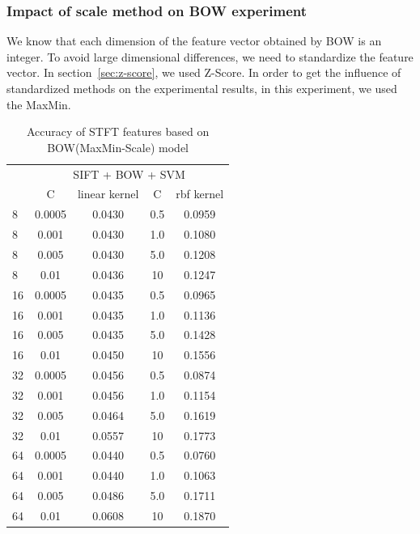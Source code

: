 \documentclass[conference]{IEEEtran}
\begin{document}
\subsubsection{Impact of scale method on BOW experiment}
We know that each dimension of the feature vector obtained by BOW is an integer. To avoid large dimensional differences, we need to standardize the feature vector. In section~\ref{sec:z-score}, we used Z-Score. In order to get the influence of standardized methods on the experimental results, in this experiment, we used the MaxMin.

\begin{table}[htbp]
	\centering
	\newcommand{\tabincell}[2]{\begin{tabular}{@{}#1@{}}#2\end{tabular}}
	\renewcommand\arraystretch{1.0}
	\caption{Accuracy of STFT features based on BOW(MaxMin-Scale) model}
	\label{base6}%
	\begin{tabular}{@{}p{1cm}<{\centering}|c|c|c|c}
		\hline
		\multirow{2}{*}{\diagbox[height=2\line,width=1.42cm,font=\tiny]{$k$}{Acc.}{$\mathit{M}$}} &
		\multicolumn{4}{c}{SIFT + BOW + SVM}\\
		\cline{2-5}
		& {C} & {linear kernel} & {C} & {rbf kernel}\\
		\hline
		8   & 0.0005 & 0.0430 & 0.5 & 0.0959\\
		8   & 0.001 & 0.0430 & 1.0 & 0.1080\\
		8   & 0.005 & 0.0430 & 5.0 & 0.1208\\
		8   & 0.01  & 0.0436 & 10 & 0.1247\\
		16   & 0.0005  & 0.0435 & 0.5 & 0.0965\\
		16   & 0.001  & 0.0435 & 1.0 & 0.1136\\
		16   & 0.005  & 0.0435 & 5.0 & 0.1428\\
		16   & 0.01  & 0.0450 & 10 & 0.1556\\
		32   & 0.0005  & 0.0456 & 0.5 & 0.0874\\
		32   & 0.001  & 0.0456 & 1.0 & 0.1154\\
		32   & 0.005  & 0.0464 & 5.0 & 0.1619\\
		32   & 0.01  & 0.0557 & 10 & 0.1773\\
		64   & 0.0005  & 0.0440 & 0.5 & 0.0760\\
		64   & 0.001  & 0.0440 & 1.0 & 0.1063\\
		64   & 0.005  & 0.0486 & 5.0 & 0.1711\\
		64   & 0.01  & 0.0608 & 10 & 0.1870\\

\end{tabular}
\end{table}
\end{document}
